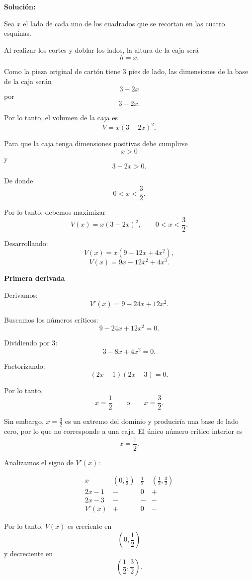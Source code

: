 \documentclass[12pt]{article}
\newcommand{\solucion}{%
    \vspace{0.8em}%
    \textbf{Solución:}%
}
\begin{document}
\begin{enumerate}[label=\alph*.-]
    \solucion

    Sea $x$ el lado de cada uno de los cuadrados que se recortan
    en las cuatro esquinas.

    Al realizar los cortes y doblar los lados, la altura de la caja
    será
    \[
    h=x.
    \]

    Como la pieza original de cartón tiene $3$ pies de lado, las
    dimensiones de la base de la caja serán
    \[
    3-2x
    \]
    por
    \[
    3-2x.
    \]

    Por lo tanto, el volumen de la caja es
    \[
    V=x(3-2x)^2.
    \]

    Para que la caja tenga dimensiones positivas debe cumplirse
    \[
    x>0
    \]
    y
    \[
    3-2x>0.
    \]

    De donde
    \[
    0<x<\frac32.
    \]

    Por lo tanto, debemos maximizar
    \[
    \boxed{
    V(x)=x(3-2x)^2,
    \qquad 0<x<\frac32.
    }
    \]

    Desarrollando:
    \[
    V(x)
    =
    x(9-12x+4x^2),
    \]
    \[
    V(x)=9x-12x^2+4x^3.
    \]

    \textbf{Primera derivada}

    Derivamos:
    \[
    V'(x)=9-24x+12x^2.
    \]

    Buscamos los números críticos:
    \[
    9-24x+12x^2=0.
    \]

    Dividiendo por $3$:
    \[
    3-8x+4x^2=0.
    \]

    Factorizando:
    \[
    (2x-1)(2x-3)=0.
    \]

    Por lo tanto,
    \[
    x=\frac12
    \qquad\text{o}\qquad
    x=\frac32.
    \]

    Sin embargo, $x=\frac32$ es un extremo del dominio y produciría
    una base de lado cero, por lo que no corresponde a una caja.
    El único número crítico interior es
    \[
    x=\frac12.
    \]

    Analizamos el signo de $V'(x)$:

    \[
    \begin{array}{c|ccc}
    x & (0,\frac12) & \frac12 & (\frac12,\frac32)\\
    \hline
    2x-1 & - & 0 & +\\
    2x-3 & - & - & -\\
    \hline
    V'(x) & + & 0 & -
    \end{array}
    \]

    Por lo tanto, $V(x)$ es creciente en
    \[
    \left(0,\frac12\right)
    \]
    y decreciente en
    \[
    \left(\frac12,\frac32\right).
    \]


\end{enumerate}
\end{document}
